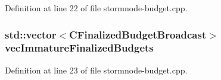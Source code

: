 Definition at line 22 of file stormnode-\/budget.\+cpp.

\hypertarget{stormnode-budget_8h_adc3baf3c59479fff7d14e28c1496a178}{}
\subsubsection[{vec\+Immature\+Finalized\+Budgets}]{\setlength{\rightskip}{0pt plus 5cm}std\+::vector$<${\bf C\+Finalized\+Budget\+Broadcast}$>$ vec\+Immature\+Finalized\+Budgets}\label{stormnode-budget_8h_adc3baf3c59479fff7d14e28c1496a178}


Definition at line 23 of file stormnode-\/budget.\+cpp.

